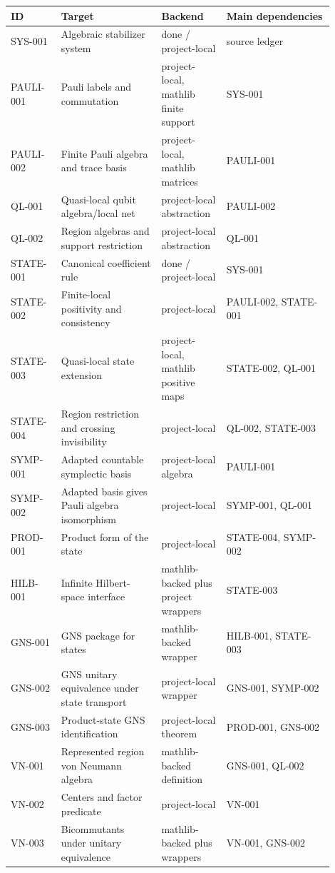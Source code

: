 \documentclass{article}
\begin{document}
\begin{longtable}{@{}p{0.13\linewidth}p{0.29\linewidth}p{0.18\linewidth}p{0.30\linewidth}@{}}
\toprule
ID & Target & Backend & Main dependencies \\
\midrule
\endhead
SYS-001 & Algebraic stabilizer system & done / project-local & source ledger \\
PAULI-001 & Pauli labels and commutation & project-local, mathlib finite support & SYS-001 \\
PAULI-002 & Finite Pauli algebra and trace basis & project-local, mathlib matrices & PAULI-001 \\
QL-001 & Quasi-local qubit algebra/local net & project-local abstraction & PAULI-002 \\
QL-002 & Region algebras and support restriction & project-local abstraction & QL-001 \\
STATE-001 & Canonical coefficient rule & done / project-local & SYS-001 \\
STATE-002 & Finite-local positivity and consistency & project-local & PAULI-002, STATE-001 \\
STATE-003 & Quasi-local state extension & project-local, mathlib positive maps & STATE-002, QL-001 \\
STATE-004 & Region restriction and crossing invisibility & project-local & QL-002, STATE-003 \\
SYMP-001 & Adapted countable symplectic basis & project-local algebra & PAULI-001 \\
SYMP-002 & Adapted basis gives Pauli algebra isomorphism & project-local & SYMP-001, QL-001 \\
PROD-001 & Product form of the state & project-local & STATE-004, SYMP-002 \\
HILB-001 & Infinite Hilbert-space interface & mathlib-backed plus project wrappers & STATE-003 \\
GNS-001 & GNS package for states & mathlib-backed wrapper & HILB-001, STATE-003 \\
GNS-002 & GNS unitary equivalence under state transport & project-local wrapper & GNS-001, SYMP-002 \\
GNS-003 & Product-state GNS identification & project-local theorem & PROD-001, GNS-002 \\
VN-001 & Represented region von Neumann algebra & mathlib-backed definition & GNS-001, QL-002 \\
VN-002 & Centers and factor predicate & project-local & VN-001 \\
VN-003 & Bicommutants under unitary equivalence & mathlib-backed plus wrappers & VN-001, GNS-002 \\

\end{longtable}
\end{document}

